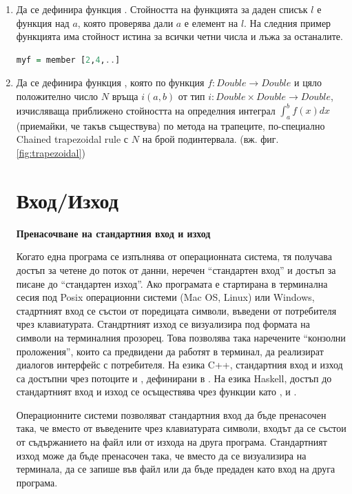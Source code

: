 \begin{enumerate}[]
\item Да се дефинира функция . Стойността на функцията за даден списък $l$ е функция над $a$, която проверява дали $a$ е елемент на $l$. На следния пример функцията  има стойност истина за всички четни числа и лъжа за останалите.

\begin{lstlisting}[basicstyle=\small,language=Haskell]
myf = member [2,4,..]
\end{lstlisting}

\item Да се дефинира функция , която по функция $f: Double \rightarrow Double$ и цяло положително число $N$ връща $i(a,b)$ от тип $i:Double \times Double \rightarrow Double$, изчисляваща приближено стойността на определния интеграл $\int_{a}^{b} f(x) dx$ (приемайки, че такъв съществува) по метода на трапеците, по-специално Chained trapezoidal rule\cite{trapezoidal} с $N$ на брой подинтервала. (вж. фиг. \ref{fig:trapezoidal})

\section {Вход/Изход}


\begin{mdframed}[hidealllines=true,backgroundcolor=gray!20]
\textbf{Пренасочване на стандартния вход и изход}

Когато една програма се изпълнява от операционната система, тя получава достъп за четене до поток от данни, неречен ``стандартен вход'' и достъп за писане до ``стандартен изход''. Ако програмата е стартирана в терминална сесия под Posix операционни системи (Mac OS, Linux) или Windows, стадртният вход се състои от поредицата символи, въведени от потребителя чрез клавиатурата. Стандртният изход се визуализира под формата на символи на терминалния прозорец. Това позволява така наречените ``конзолни проложения'', които са предвидени да работят в терминал, да реализират диалогов интерфейс с потребителя. На езика C++, стандартния вход и изход са достъпни чрез потоците  и , дефинирани в . На езика Haskell, достъп до стандартният вход и изход се осъществява чрез функции като ,  и .

Операционните системи позволяват стандартния вход да бъде пренасочен така, че вместо от въведените чрез клавиатурата символи, входът да се състои от съдържанието на файл или от изхода на друга програма. Стандартният изход може да бъде пренасочен така, че вместо да се визуализира на терминала, да се запише във файл или да бъде предаден като вход на друга програма.


\end{mdframed}
\end{enumerate}
